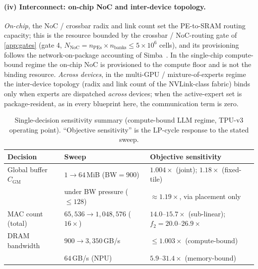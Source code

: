 \paragraph{(iv) Interconnect: on-chip NoC and inter-device topology.}
\emph{On-chip}, the NoC / crossbar radix and link count set the PE-to-SRAM routing capacity; this is the resource bounded by the crossbar / NoC-routing gate of \cref{app:gates} (gate 4, $N_{\mathrm{NoC}}=n_{\mathrm{PEs}}\times n_{\mathrm{banks}}\le5\times10^{6}$ cells), and its provisioning follows the network-on-package accounting of Simba~\citep{shao2019simba}.
In the single-chip compute-bound regime the on-chip NoC is provisioned to the compute floor and is not the binding resource.
\emph{Across devices}, in the multi-GPU / mixture-of-experts regime the inter-device topology (radix and link count of the NVLink-class fabric) binds only when experts are dispatched \emph{across} devices; when the active-expert set is package-resident, as in every blueprint here, the communication term is zero.

\begin{table}[ht!]
\centering
\caption{Single-decision sensitivity summary (compute-bound LLM regime, TPU-v3
operating point). ``Objective sensitivity'' is the LP-cycle response to the
stated sweep.}
\label{tab:deficit_sweepsummary}
\small
\begin{tabularx}{\linewidth}{@{}p{.22\linewidth}p{.28\linewidth}X@{}}
\toprule
\textbf{Decision} & \textbf{Sweep} & \textbf{Objective sensitivity} \\
\midrule
Global buffer $C_{\mathrm{GM}}$ & $1\to64$\,MiB (BW$=900$)
& $1.004\times$ (joint); $1.18\times$ (fixed-tile) \\
& under BW pressure ($\le128$) & $\approx1.19\times$, via placement only \\
MAC count (total) & $65{,}536\to1{,}048{,}576$ ($16\times$)
& $14.0$--$15.7\times$ (sub-linear); $f_2=20.0$--$26.9\times$ \\
DRAM bandwidth & $900\to3{,}350$\,GB/s & $\le1.003\times$ (compute-bound) \\
& $64$\,GB/s (NPU) & $5.9$--$31.4\times$ (memory-bound) \\
\bottomrule
\end{tabularx}
\end{table}


